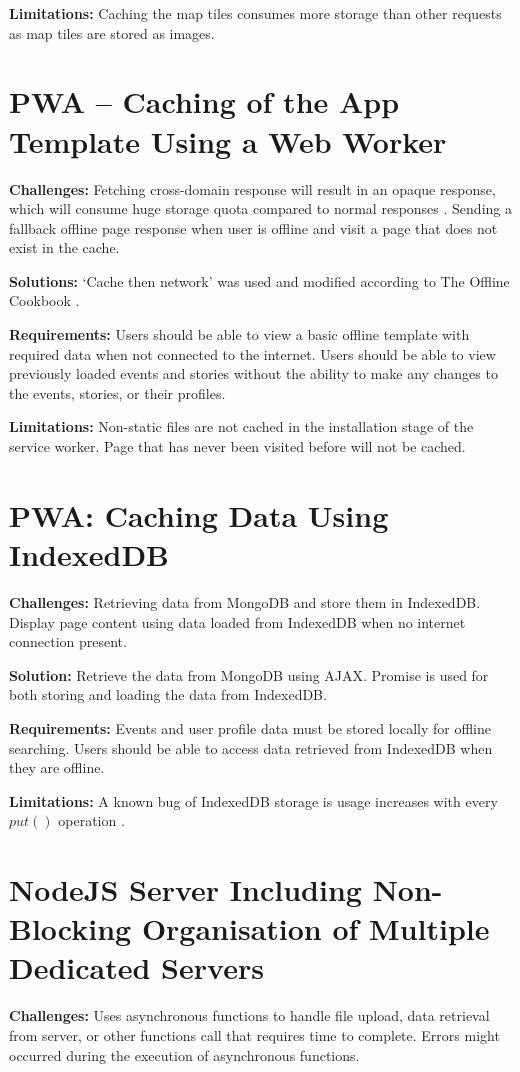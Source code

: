 \documentclass[11pt, a4paper]{article}
\begin{document}
\textbf{Limitations:} Caching the map tiles consumes more storage than other requests as map tiles
are stored as images. 

\section{PWA – Caching of the App Template Using a Web Worker}
\textbf{Challenges:} Fetching cross-domain response will result in an opaque response, which will
consume huge storage quota compared to normal responses \cite{opaque_workbox}. Sending a fallback
offline page response when user is offline and visit a page that does not exist in the cache.

\textbf{Solutions:} `Cache then network' was used and modified according to The Offline
Cookbook \cite{offline_cookbook}.

\textbf{Requirements:} Users should be able to view a basic offline template with required data
when not connected to the internet. Users should be able to view previously loaded events and
stories without the ability to make any changes to the events, stories, or their profiles.

\textbf{Limitations:} Non-static files are not cached in the installation stage of the service
worker. Page that has never been visited before will not be cached. 

\section{PWA: Caching Data Using IndexedDB}
\textbf{Challenges:} Retrieving data from MongoDB and store them in IndexedDB. Display page
content using data loaded from IndexedDB when no internet connection present.

\textbf{Solution:} Retrieve the data from MongoDB using AJAX. Promise is used for both storing and
loading the data from IndexedDB.

\textbf{Requirements:} Events and user profile data must be stored locally for offline searching.
Users should be able to access data retrieved from IndexedDB when they are offline.

\textbf{Limitations:} A known bug of IndexedDB storage is usage increases with every $put()$
operation \cite{leveldb_593, leveldb_603}. 

\section{NodeJS Server Including Non-Blocking Organisation of Multiple Dedicated Servers}
\textbf{Challenges:} Uses asynchronous functions to handle file upload, data retrieval from server,
or other functions call that requires time to complete. Errors might occurred during the execution
of asynchronous functions.
\end{document}
